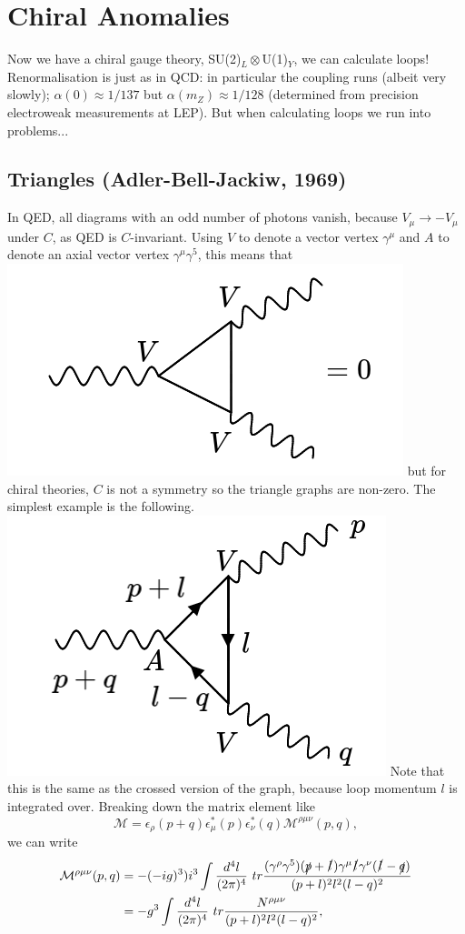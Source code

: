 \section{Chiral Anomalies}
%
Now we have a chiral gauge theory, SU(2)$_L\otimes$U(1)$_Y$, we can calculate loops! Renormalisation is just as in QCD: in particular the coupling runs (albeit very slowly); $\alpha(0) \approx 1/137$ but $\alpha(m_Z) \approx 1/128$ (determined from precision electroweak measurements at LEP). But when calculating loops we run into problems...
%
\subsection{Triangles (Adler-Bell-Jackiw, 1969)}
%
In QED, all diagrams with an odd number of photons vanish, because $V_\mu \to -V_\mu$ under $C$, as QED is $C$-invariant. Using $V$ to denote a vector vertex $\gamma^\mu$ and $A$ to denote an axial vector vertex $\gamma^\mu \gamma^5$, this means that 
\newline
\includegraphics[width=0.4\linewidth]{figs/39a.png}
\newline
but for chiral theories, $C$ is not a symmetry so the triangle graphs are non-zero. The simplest example is the following.
\newline
\includegraphics[width=0.4\linewidth]{figs/39b.png}
\newline
Note that this is the same as the crossed version of the graph, because loop momentum $l$ is integrated over. Breaking down the matrix element like
\begin{equation}
\mathcal{M} = \epsilon_\rho(p+q)\epsilon_\mu^*(p)\epsilon_\nu^*(q)\mathcal{M}^{\rho \mu \nu}(p,q),
\end{equation}
we can write
\begin{equation}
\begin{split}
\mathcal{M}^{\rho \mu \nu}(p,q) &= - (-ig)^3)i^3 \int \frac{d^4l}{(2\pi)^4}\ tr \frac{(\gamma^\rho \gamma^5)(\slashed{p} + \slashed{l})\gamma^\mu \slashed{l} \gamma^\nu (\slashed{l} - \slashed{q})}{(p+l)^2l^2(l-q)^2} \\
&= - g^3 \int \frac{d^4l}{(2\pi)^4}\ tr \frac{N^{\rho \mu \nu}}{(p+l)^2l^2(l-q)^2}, 
\end{split}
\end{equation}
